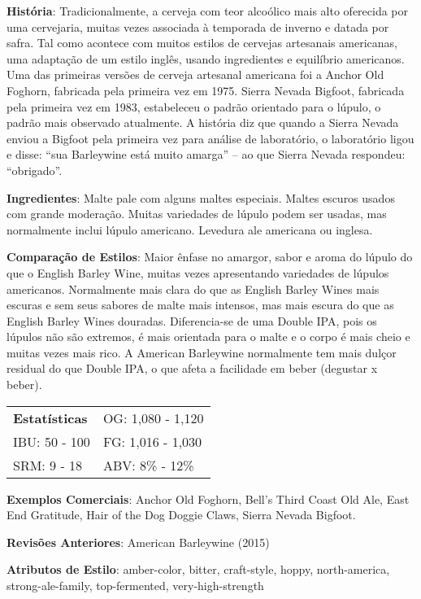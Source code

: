 \textbf{História}: Tradicionalmente, a cerveja com teor alcoólico mais alto oferecida por uma cervejaria, muitas vezes associada à temporada de inverno e datada por safra. Tal como acontece com muitos estilos de cervejas artesanais americanas, uma adaptação de um estilo inglês, usando ingredientes e equilíbrio americanos. Uma das primeiras versões de cerveja artesanal americana foi a Anchor Old Foghorn, fabricada pela primeira vez em 1975. Sierra Nevada Bigfoot, fabricada pela primeira vez em 1983, estabeleceu o padrão orientado para o lúpulo, o padrão mais observado atualmente. A história diz que quando a Sierra Nevada enviou a Bigfoot pela primeira vez para análise de laboratório, o laboratório ligou e disse: “sua Barleywine está muito amarga” – ao que Sierra Nevada respondeu: “obrigado”.

\textbf{Ingredientes}: Malte pale com alguns maltes especiais. Maltes escuros usados com grande moderação. Muitas variedades de lúpulo podem ser usadas, mas normalmente inclui lúpulo americano. Levedura ale americana ou inglesa.

\textbf{Comparação de Estilos}: Maior ênfase no amargor, sabor e aroma do lúpulo do que o English Barley Wine, muitas vezes apresentando variedades de lúpulos americanos. Normalmente mais clara do que as English Barley Wines mais escuras e sem seus sabores de malte mais intensos, mas mais escura do que as English Barley Wines douradas. Diferencia-se de uma Double IPA, pois os lúpulos não são extremos, é mais orientada para o malte e o corpo é mais cheio e muitas vezes mais rico. A American Barleywine normalmente tem mais dulçor residual do que Double IPA, o que afeta a facilidade em beber (degustar x beber).

\begin{tabular}{@{}p{35mm}p{35mm}@{}}
  \textbf{Estatísticas} & OG: 1,080 - 1,120  \\
  IBU: 50 - 100  & FG: 1,016 - 1,030  \\
  SRM: 9 - 18 & ABV: 8\% - 12\%
\end{tabular}

\textbf{Exemplos Comerciais}: Anchor Old Foghorn, Bell's Third Coast Old Ale, East End Gratitude, Hair of the Dog Doggie Claws, Sierra Nevada Bigfoot.

\textbf{Revisões Anteriores}: American Barleywine (2015)

\textbf{Atributos de Estilo}: amber-color, bitter, craft-style, hoppy, north-america, strong-ale-family, top-fermented, very-high-strength
